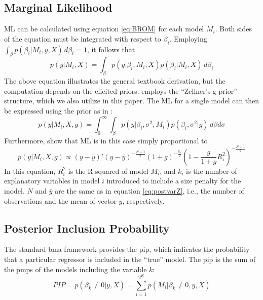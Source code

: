 \documentclass[a4paper,11pt]{article}
\begin{document}
\subsection*{Marginal Likelihood}\label{sec:ML}
ML can be calculated using equation \ref{eq:BROM} for each model $M_{i}$. Both sides of the equation must be integrated with respect to $\beta_{i}$. Employing $\int_{\beta} p(\beta_{i}\vert M_{i},y,X) \, d\beta_{i}=1$, it follows that
%
\begin{equation}\label{eq:ML}
p(y \vert  M_{i},X) = \int_{\beta}{p(y \vert \beta_{i},M_{i},X)p(\beta_{i} \vert M_{i},X) \, d\beta_{i}}
\end{equation}
The above equation illustrates the general textbook derivation, but the computation depends on the elicited priors. \citet{Zeugner2011} employs the ``Zellner's g prior'' structure, which we also utilize in this paper. The ML for a single model can then be expressed using the prior as in \citet{FeldkircherZeugner2009}:
\begin{equation}\label{eq:MLFZ}
p(y \vert  M_{i},X,g) = \int_{0}^{\infty}{\int_{\beta}{p(y \vert \beta_{i}, \sigma^{2},M_{i})p(\beta_{i},\sigma^{2} \vert g) \, d\beta d\sigma}}
\end{equation}
Furthermore, \citet{FeldkircherZeugner2009} show that ML is in this case simply proportional to
%
\begin{equation}
\label{eq:MLg}
p(y \vert M_{i}, X, g) \propto (y-\bar{y})'(y-\bar{y})^{- \frac{N-1}{2}} (1+g)^{- \frac{k_{i}}{2}} \left(1- \frac{g}{1+g}R^{2}_{i} \right)^{- \frac{N-1}{2}}
\end{equation}
In this equation, $R^{2}_{i}$ is the R-squared of model $M_{i}$, and $k_{i}$ is the number of explanatory variables in model $i$ introduced to include a size penalty for the model. $N$ and $\bar{y}$ are the same as in equation \ref{eq:postvarZ}, i.e., the number of observations and the mean of vector $y$, respectively.
\subsection*{Posterior Inclusion Probability}
The standard \ac{bma} framework provides the \ac{pip}, which indicates the probability that a particular regressor is included in the ``true'' model. The \ac{pip} is the sum of the \ac{pmp}s of the models including the variable $k$:
\begin{equation}\label{PIP}
PIP = p(\beta_{k} \neq 0 \vert y, X) = \sum_{i=1}^{2^{K}} p(M_{i} \vert \beta_{k} \neq 0, y, X)
\end{equation}
\end{document}
